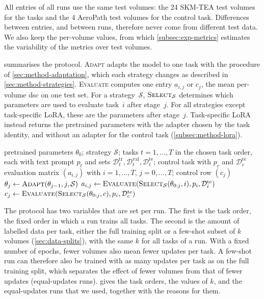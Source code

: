All entries of all runs use the same test volumes: the 24 SKM-TEA test volumes for the tasks and the 4 AeroPath test volumes for the control task.
Differences between entries, and between runs, therefore never come from different test data.
We also keep the per-volume values, from which \cref{subsec:exp-metrics} estimates the variability of the metrics over test volumes.

 summarises the protocol.
\textsc{Adapt} adapts the model to one task with the procedure of \cref{sec:method-adaptation}, which each strategy changes as described in \cref{sec:method-strategies}.
\textsc{Evaluate} computes one entry $a_{i,j}$ or $c_j$, the mean per-volume \gls{dsc} on one test set.
For a strategy~$\mathcal{S}$, $\textsc{Select}_{\mathcal{S}}$ determines which parameters are used to evaluate task~$i$ after stage~$j$.
For all strategies except task-specific LoRA, these are the parameters after stage~$j$.
Task-specific LoRA instead returns the pretrained parameters with the adapter chosen by the task identity, and without an adapter for the control task (\cref{subsec:method-lora}).

\begin{algorithm}[tb]
\caption{Continual adaptation and evaluation protocol for strategy~$\mathcal{S}$.}
\label{alg:protocol}
\begin{algorithmic}[1]
\REQUIRE pretrained parameters $\theta_0$; strategy $\mathcal{S}$; tasks $t = 1, \dots, T$ in the chosen task order, each with text prompt $p_t$ and sets $\mathcal{D}_t^{\mathrm{tr}}, \mathcal{D}_t^{\mathrm{val}}, \mathcal{D}_t^{\mathrm{te}}$; control task with $p_c$ and $\mathcal{D}_c^{\mathrm{te}}$
\ENSURE evaluation matrix $(a_{i,j})$ with $i = 1, \dots, T$, $j = 0, \dots, T$; control row $(c_j)$
    \STATE $\theta_j \gets \textsc{Adapt}(\theta_{j-1}, j, \mathcal{S})$ 
  \ENDIF
    \STATE $a_{i,j} \gets \textsc{Evaluate}(\textsc{Select}_{\mathcal{S}}(\theta_{0:j}, i), p_i, \mathcal{D}_i^{\mathrm{te}})$
  \ENDFOR
  \STATE $c_j \gets \textsc{Evaluate}(\textsc{Select}_{\mathcal{S}}(\theta_{0:j}, c), p_c, \mathcal{D}_c^{\mathrm{te}})$
\ENDFOR
\end{algorithmic}
\end{algorithm}

The protocol has two variables that are set per run.
The first is the task order, the fixed order in which a run trains all tasks.
The second is the amount of labelled data per task, either the full training split or a few-shot subset of $k$ volumes (\cref{sec:data-splits}), with the same $k$ for all tasks of a run.
With a fixed number of epochs, fewer volumes also mean fewer updates per task.
A few-shot run can therefore also be trained with as many updates per task as on the full training split, which separates the effect of fewer volumes from that of fewer updates (equal-updates runs).
 gives the task orders, the values of $k$, and the equal-updates runs that we used, together with the reasons for them.

